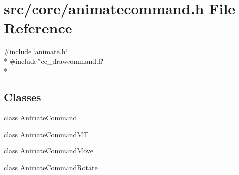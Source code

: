 \hypertarget{a00198}{\section{src/core/animatecommand.h File Reference}
\label{a00198}
}
{\ttfamily \#include \char`\"{}animate.\-h\char`\"{}}\\*
{\ttfamily \#include \char`\"{}cc\-\_\-drawcommand.\-h\char`\"{}}\\*
\subsection*{Classes}
\begin{DoxyCompactItemize}
\item 
class \hyperlink{a00003}{Animate\-Command}
\item 
class \hyperlink{a00005}{Animate\-Command\-M\-T}
\item 
class \hyperlink{a00004}{Animate\-Command\-Move}
\item 
class \hyperlink{a00006}{Animate\-Command\-Rotate}
\end{DoxyCompactItemize}
